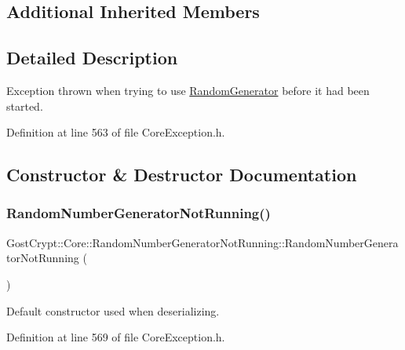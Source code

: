 \subsection*{Additional Inherited Members}


\subsection{Detailed Description}
Exception thrown when trying to use \hyperlink{class_gost_crypt_1_1_core_1_1_random_generator}{Random\+Generator} before it had been started. 

Definition at line 563 of file Core\+Exception.\+h.



\subsection{Constructor \& Destructor Documentation}
\mbox{\label{class_gost_crypt_1_1_core_1_1_random_number_generator_not_running_aed495cf0eaec6c81abe86e2d3107edc8}} 
\subsubsection{\texorpdfstring{Random\+Number\+Generator\+Not\+Running()}{RandomNumberGeneratorNotRunning()}\hspace{0.1cm}{\footnotesize\ttfamily [1/2]}}
{\footnotesize\ttfamily Gost\+Crypt\+::\+Core\+::\+Random\+Number\+Generator\+Not\+Running\+::\+Random\+Number\+Generator\+Not\+Running (\begin{DoxyParamCaption}{ }\end{DoxyParamCaption})\hspace{0.3cm}{\ttfamily [inline]}}



Default constructor used when deserializing. 



Definition at line 569 of file Core\+Exception.\+h.

